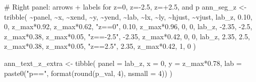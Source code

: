 \documentclass[
  letterpaper,
  DIV=11,
  numbers=noendperiod]{scrreprt}
\newenvironment{Shaded}{\begin{snugshade}}{\end{snugshade}}
\newcommand{\AttributeTok}[1]{\textcolor[rgb]{0.40,0.45,0.13}{#1}}
\newcommand{\CommentTok}[1]{\textcolor[rgb]{0.37,0.37,0.37}{#1}}
\newcommand{\DecValTok}[1]{\textcolor[rgb]{0.68,0.00,0.00}{#1}}
\newcommand{\FloatTok}[1]{\textcolor[rgb]{0.68,0.00,0.00}{#1}}
\newcommand{\FunctionTok}[1]{\textcolor[rgb]{0.28,0.35,0.67}{#1}}
\newcommand{\NormalTok}[1]{\textcolor[rgb]{0.00,0.23,0.31}{#1}}
\newcommand{\OtherTok}[1]{\textcolor[rgb]{0.00,0.23,0.31}{#1}}
\newcommand{\SpecialCharTok}[1]{\textcolor[rgb]{0.37,0.37,0.37}{#1}}
\newcommand{\StringTok}[1]{\textcolor[rgb]{0.13,0.47,0.30}{#1}}
\begin{document}
\begin{Shaded}
\begin{Highlighting}[]
\CommentTok{\# Right panel: arrows + labels for z=0, z={-}2.5, z=+2.5, and p}
\NormalTok{ann\_seg\_z }\OtherTok{\textless{}{-}} \FunctionTok{tribble}\NormalTok{(}
  \SpecialCharTok{\textasciitilde{}}\NormalTok{panel, }\SpecialCharTok{\textasciitilde{}}\NormalTok{x,    }\SpecialCharTok{\textasciitilde{}}\NormalTok{xend,  }\SpecialCharTok{\textasciitilde{}}\NormalTok{y,            }\SpecialCharTok{\textasciitilde{}}\NormalTok{yend,         }\SpecialCharTok{\textasciitilde{}}\NormalTok{lab,          }\SpecialCharTok{\textasciitilde{}}\NormalTok{lx,   }\SpecialCharTok{\textasciitilde{}}\NormalTok{ly,            }\SpecialCharTok{\textasciitilde{}}\NormalTok{hjust, }\SpecialCharTok{\textasciitilde{}}\NormalTok{vjust,}
\NormalTok{  lab\_z,  }\FloatTok{0.10}\NormalTok{,  }\DecValTok{0}\NormalTok{,      z\_max}\SpecialCharTok{*}\FloatTok{0.92}\NormalTok{,    z\_max}\SpecialCharTok{*}\FloatTok{0.62}\NormalTok{,    }\StringTok{"z==0"}\NormalTok{,        }\FloatTok{0.10}\NormalTok{,  z\_max}\SpecialCharTok{*}\FloatTok{0.96}\NormalTok{,     }\DecValTok{0}\NormalTok{,      }\DecValTok{0}\NormalTok{,}
\NormalTok{  lab\_z, }\SpecialCharTok{{-}}\FloatTok{2.35}\NormalTok{, }\SpecialCharTok{{-}}\FloatTok{2.5}\NormalTok{,    z\_max}\SpecialCharTok{*}\FloatTok{0.38}\NormalTok{,    z\_max}\SpecialCharTok{*}\FloatTok{0.05}\NormalTok{,    }\StringTok{"z=={-}2.5"}\NormalTok{,    }\SpecialCharTok{{-}}\FloatTok{2.35}\NormalTok{,  z\_max}\SpecialCharTok{*}\FloatTok{0.42}\NormalTok{,     }\DecValTok{0}\NormalTok{,      }\DecValTok{0}\NormalTok{,}
\NormalTok{  lab\_z,  }\FloatTok{2.35}\NormalTok{,  }\FloatTok{2.5}\NormalTok{,    z\_max}\SpecialCharTok{*}\FloatTok{0.38}\NormalTok{,    z\_max}\SpecialCharTok{*}\FloatTok{0.05}\NormalTok{,    }\StringTok{"z==2.5"}\NormalTok{,      }\FloatTok{2.35}\NormalTok{,  z\_max}\SpecialCharTok{*}\FloatTok{0.42}\NormalTok{,     }\DecValTok{1}\NormalTok{,      }\DecValTok{0}
\NormalTok{)}

\NormalTok{ann\_text\_z\_extra }\OtherTok{\textless{}{-}} \FunctionTok{tibble}\NormalTok{(}
  \AttributeTok{panel =}\NormalTok{ lab\_z,}
  \AttributeTok{x =} \DecValTok{0}\NormalTok{, }\AttributeTok{y =}\NormalTok{ z\_max}\SpecialCharTok{*}\FloatTok{0.78}\NormalTok{,}
  \AttributeTok{lab =} \FunctionTok{paste0}\NormalTok{(}\StringTok{"p=="}\NormalTok{, }\FunctionTok{format}\NormalTok{(}\FunctionTok{round}\NormalTok{(p\_val, }\DecValTok{4}\NormalTok{), }\AttributeTok{nsmall =} \DecValTok{4}\NormalTok{))}
\NormalTok{)}


\end{Highlighting}
\end{Shaded}
\end{document}
